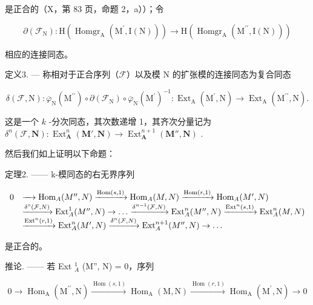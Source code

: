 是正合的（X，第 83 页，命题 2，a））；令

\[
\partial (\mathcal {F} _ {\mathrm{N}}): \mathrm{H} (\operatorname{Homgr} _ {\mathrm{A}} (\mathrm{M} ^ {\prime}, \mathrm{I} (\mathrm{N}))) \rightarrow \mathrm{H} (\operatorname{Homgr} _ {\mathrm{A}} (\mathrm{M} ^ {\prime \prime}, \mathrm{I} (\mathrm{N})))
\]

相应的连接同态。

定义3. --- 称相对于正合序列（\(\mathcal{F}\)）以及模 N 的扩张模的连接同态为复合同态

\[
\delta (\mathcal {F}, \mathrm{N}): \overline {{\varphi}} _ {\mathrm{N}} (\mathrm{M} ^ {\prime \prime}) \circ \partial (\mathcal {F} _ {\mathrm{N}}) \circ \overline {{\varphi}} _ {\mathrm{N}} (\mathrm{M} ^ {\prime}) ^ {- 1}: \operatorname{Ext} _ {\mathrm{A}} (\mathrm{M} ^ {\prime}, \mathrm{N}) \rightarrow \operatorname{Ext} _ {\mathrm{A}} (\mathrm{M} ^ {\prime \prime}, \mathrm{N}).
\]

这是一个 \(k\) -分次同态，其次数递增 1，其齐次分量记为 \(\delta^{n}(\mathcal{F}, \mathbf{N}) : \operatorname{Ext}_{\mathbf{A}}^{n}(\mathbf{M}', \mathbf{N}) \to \operatorname{Ext}_{\mathbf{A}}^{n+1}(\mathbf{M}'', \mathbf{N})\) .

然后我们如上证明以下命题：

定理2. —— k-模同态的右无界序列

\[
\begin{array}{r l} 0 & \xrightarrow {\quad} \operatorname{Hom} _ {A} (M ^ {\prime \prime}, N) \xrightarrow {\operatorname{Hom} (s , 1)} \operatorname{Hom} _ {A} (M, N) \xrightarrow {\operatorname{Hom} (r , 1)} \operatorname{Hom} _ {A} (M ^ {\prime}, N) \\ & \xrightarrow {\delta^ {\circ} (\mathcal {F} , N)} \operatorname{Ext} _ {A} ^ {1} (M ^ {\prime \prime}, N) \to \dots \xrightarrow {\delta^ {n - 1} (\mathcal {F} , N)} \operatorname{Ext} _ {A} ^ {n} (M ^ {\prime \prime}, N) \xrightarrow {\operatorname{Ext} ^ {n} (s , 1)} \operatorname{Ext} _ {A} ^ {n} (M, N) \\ & \xrightarrow {\operatorname{Ext} ^ {n} (r , 1)} \operatorname{Ext} _ {A} ^ {n} (M ^ {\prime}, N) \xrightarrow {\delta^ {n} (\mathcal {F} , N)} \operatorname{Ext} _ {A} ^ {n + 1} (M ^ {\prime \prime}, N) \to \dots \end{array}
\]

是正合的。

推论. —— 若 Ext \(_{A}^{1}\) (M'', N) = 0，序列

\[
0 \longrightarrow \operatorname{Hom} _ {\mathrm{A}} \left(\mathrm{M} ^ {\prime \prime}, \mathrm{N}\right) \xrightarrow {\operatorname{Hom} (s , 1)} \operatorname{Hom} _ {\mathrm{A}} (\mathrm{M}, \mathrm{N}) \xrightarrow {\operatorname{Hom} (r , 1)} \operatorname{Hom} _ {\mathrm{A}} \left(\mathrm{M} ^ {\prime}, \mathrm{N}\right) \longrightarrow 0
\]

